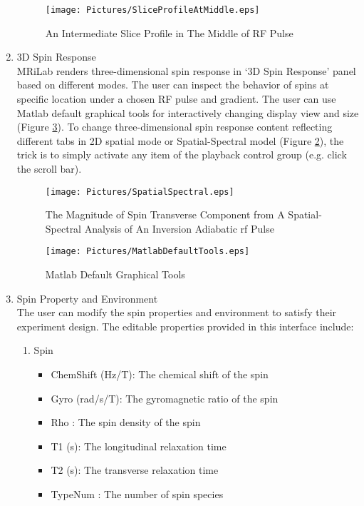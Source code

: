 \documentclass{book}%
\begin{document}
\begin{enumerate}
\begin{figure}[htbp]
	\centering
		\texttt{[image: Pictures/SliceProfileAtMiddle.eps]}
	\caption{An Intermediate Slice Profile in The Middle of RF Pulse}
	\label{fig:SliceProfileAtMiddle}
\end{figure}

	\item 3D Spin Response \\

MRiLab renders three-dimensional spin response in `3D Spin Response' panel based on different modes. The user can inspect the behavior of spins at specific location under a chosen RF pulse and gradient. The user can use Matlab default graphical tools for interactively changing display view and size (Figure \ref{fig:MatlabDefaultTools}). To change three-dimensional spin response content reflecting different tabs in 2D spatial mode or Spatial-Spectral model (Figure \ref{fig:SpatialSpectral}), the trick is to simply activate any item of the playback control group (e.g. click the scroll bar).

\begin{figure}[htbp]
	\centering
		\texttt{[image: Pictures/SpatialSpectral.eps]}
	\caption{The Magnitude of Spin Transverse Component from A Spatial-Spectral Analysis of An Inversion Adiabatic rf Pulse}
	\label{fig:SpatialSpectral}
\end{figure}

\begin{figure}[htbp]
	\centering
		\texttt{[image: Pictures/MatlabDefaultTools.eps]}
	\caption{Matlab Default Graphical Tools}
	\label{fig:MatlabDefaultTools}
\end{figure}

\item Spin Property and Environment \\

The user can modify the spin properties and environment to satisfy their experiment design. The editable properties provided in this interface include:

\begin{enumerate}

\item Spin
\begin{itemize}
	\item ChemShift (Hz/T): The chemical shift of the spin
	\item Gyro (rad/s/T): The gyromagnetic ratio of the spin
	\item Rho : The spin density of the spin
	\item T1 (s): The longitudinal relaxation time
	\item T2 (s): The transverse relaxation time
	\item TypeNum : The number of spin species
\end{itemize}


\end{enumerate}
\end{enumerate}
\end{document}
